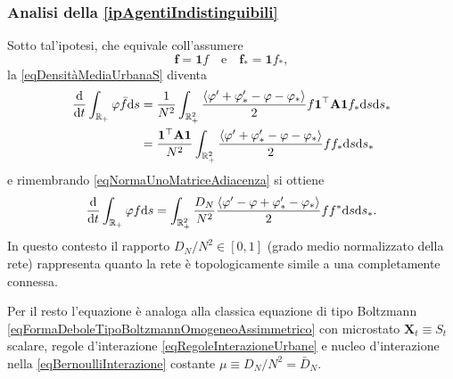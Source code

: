             \subsubsection{Analisi della \texorpdfstring{\ref{ipAgentiIndistinguibili}}{S2}}

                Sotto tal'ipotesi, che equivale coll'assumere
                \begin{equation*}
                    \mathbf f=\mathbf1f
                    \quad\text{e}\quad
                    \mathbf f_*=\mathbf1f_*,
                \end{equation*}
                la \ref{eqDensitàMediaUrbanaS} diventa
                \begin{equation*}
                    \begin{aligned}
                        \frac{\mathrm{d}}{\mathrm{d}t}\int_{\mathbb R_+}\varphi\bar f\mathrm{d} s
                        &=\frac1{N^2}\int_{\mathbb R_+^2}
                        \frac{\langle\varphi'+\varphi'_*-\varphi-\varphi_*\rangle}2
                        f\mathbf1^\top\mathbf A\mathbf1f_*\mathrm{d} s\mathrm{d} s_*\\
                        &=\frac{\mathbf1^\top\textbf A\mathbf1}{N^2}\int_{\mathbb R_+^2}
                        \frac{\langle\varphi'+\varphi'_*-\varphi-\varphi_*\rangle}2
                        ff_*\mathrm{d} s\mathrm{d} s_*
                    \end{aligned}
                \end{equation*}
                e rimembrando \cref{eqNormaUnoMatriceAdiacenza} si ottiene
                \begin{equation*}
                    \frac{\mathrm{d}}{\mathrm{d}t}\int_{\mathbb R_+}\varphi f\mathrm{d} s=
                    \int_{\mathbb R_+^2}\frac{D_N}{N^2}
                    \frac{\langle\varphi'-\varphi+\varphi'_*-\varphi_*\rangle}2
                    ff^*\mathrm{d} s\mathrm{d} s_*.
                \end{equation*}
                In questo contesto il rapporto \(D_N/N^2\in[0,1]\) (grado medio normalizzato della rete) rappresenta quanto la rete è topologicamente simile a una completamente connessa\footnotemark{}.%
               
                Per il resto l'equazione è analoga alla classica equazione di tipo Boltzmann \ref{eqFormaDeboleTipoBoltzmannOmogeneoAssimmetrico} con microstato \(\mathbf X_t\equiv S_t\) scalare, regole d'interazione \ref{eqRegoleInterazioneUrbane} e nucleo d'interazione nella \ref{eqBernoulliInterazione} costante \(\mu\equiv D_N/N^2=\bar D_N\).
                

